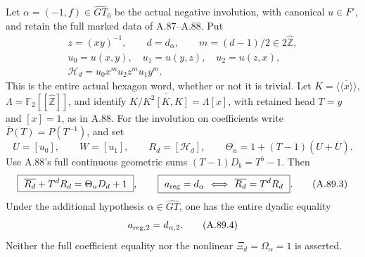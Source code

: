 Let \(\alpha=(-1,f)\in\widehat{GT}_0\) be the actual negative involution,
with canonical \(u\in F'\), and retain the full marked data of
A.87--A.88. Put
\[
 \begin{gathered}
 z=(xy)^{-1},\qquad d=d_\alpha,\qquad m=(d-1)/2\in2\widehat{\mathbb Z},\\
 u_0=u(x,y),\quad u_1=u(y,z),\quad u_2=u(z,x),\\
 \mathcal H_d=u_0x^m u_2z^m u_1y^m .
 \end{gathered}
 \tag{A.89.1}
\]
This is the entire actual hexagon word, whether or not it is trivial.
Let \(K=\overline{\langle\!\langle x\rangle\!\rangle}\),
\(\Lambda=\mathbb F_2[[\widehat{\mathbb Z}]]\), and identify
\(K/\overline{K^2[K,K]}=\Lambda[x]\), with retained head \(T=y\)
and \([x]=1\), as in A.88. For the involution on coefficients write
\(\overline{P}(T)=P(T^{-1})\), and set
\[
 U=[u_0],\qquad W=[u_1],\qquad R_d=[\mathcal H_d],\qquad
 \Theta_u=1+(T-1)(U+\overline U).
 \tag{A.89.2}
\]
Use A.88's full continuous geometric sums
\((T-1)D_b=T^b-1\). Then
\[
 \boxed{\ \overline{R_d}+T^dR_d=\Theta_uD_d+1\ },
 \qquad
 \boxed{\ a_{\rm reg}=d_\alpha
       \ \Longleftrightarrow\ \overline{R_d}=T^dR_d\ }.
 \tag{A.89.3}
\]
Under the additional hypothesis \(\alpha\in\widehat{GT}\), one has
the entire dyadic equality
\[
                       a_{{\rm reg},2}=d_{\alpha,2}.
 \tag{A.89.4}
\]
Neither the full coefficient equality nor the nonlinear
\(\Xi_d=\Omega_\alpha=1\) is asserted.

